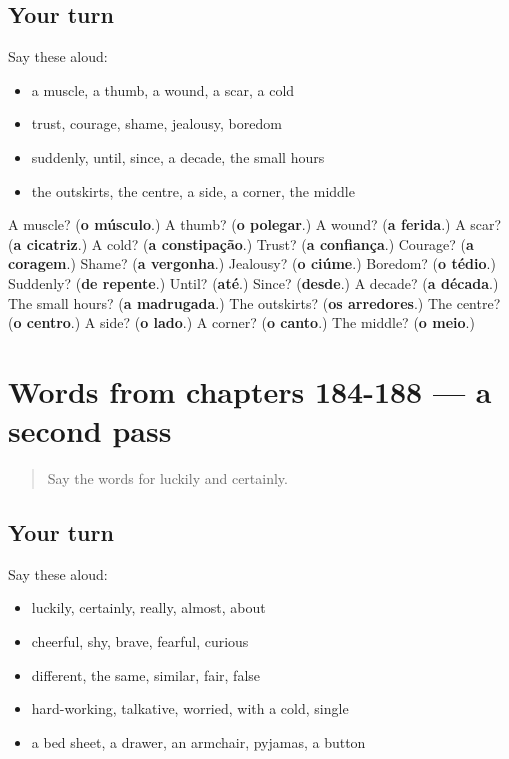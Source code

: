 \subsection*{Your turn}
Say these aloud:

\begin{itemize}
\raggedright
  \item a muscle, a thumb, a wound, a scar, a cold
  \item trust, courage, shame, jealousy, boredom
  \item suddenly, until, since, a decade, the small hours
  \item the outskirts, the centre, a side, a corner, the middle
\end{itemize}

\begin{tcolorbox}[breakable,colback=teal!4,colframe=teal!35!black,title={Before you move on}]
A muscle? (\textbf{o músculo}.) A thumb? (\textbf{o polegar}.) A wound? (\textbf{a ferida}.) A scar? (\textbf{a cicatriz}.) A cold? (\textbf{a constipação}.) Trust? (\textbf{a confiança}.) Courage? (\textbf{a coragem}.) Shame? (\textbf{a vergonha}.) Jealousy? (\textbf{o ciúme}.) Boredom? (\textbf{o tédio}.) Suddenly? (\textbf{de repente}.) Until? (\textbf{até}.) Since? (\textbf{desde}.) A decade? (\textbf{a década}.) The small hours? (\textbf{a madrugada}.) The outskirts? (\textbf{os arredores}.) The centre? (\textbf{o centro}.) A side? (\textbf{o lado}.) A corner? (\textbf{o canto}.) The middle? (\textbf{o meio}.)
\end{tcolorbox}
\section[(dialogue)]{Words from chapters 184-188 — a second pass}

\label{lesson:PT-R188-second-pass-words-from-chapters-184-188}



\begin{quote}
Say the words for luckily and certainly.
\end{quote}

\subsection*{Your turn}
Say these aloud:

\begin{itemize}
\raggedright
  \item luckily, certainly, really, almost, about
  \item cheerful, shy, brave, fearful, curious
  \item different, the same, similar, fair, false
  \item hard-working, talkative, worried, with a cold, single
  \item a bed sheet, a drawer, an armchair, pyjamas, a button
\end{itemize}

